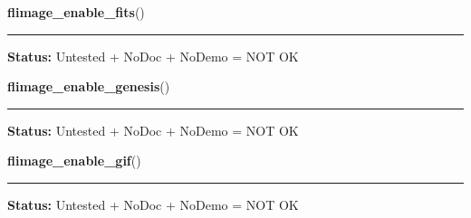     \label{xformslib:library:flimage_enable_fits}

    \vspace{0.5ex}

\hspace{.8\funcindent}\begin{boxedminipage}{\funcwidth}

    \raggedright \textbf{flimage\_enable\_fits}()

    \vspace{-1.5ex}

    \rule{\textwidth}{0.5\fboxrule}
\setlength{\parskip}{2ex}
\setlength{\parskip}{1ex}
\textbf{Status:} Untested + NoDoc + NoDemo = NOT OK



    \end{boxedminipage}

    \label{xformslib:library:flimage_enable_genesis}

    \vspace{0.5ex}

\hspace{.8\funcindent}\begin{boxedminipage}{\funcwidth}

    \raggedright \textbf{flimage\_enable\_genesis}()

    \vspace{-1.5ex}

    \rule{\textwidth}{0.5\fboxrule}
\setlength{\parskip}{2ex}
\setlength{\parskip}{1ex}
\textbf{Status:} Untested + NoDoc + NoDemo = NOT OK



    \end{boxedminipage}

    \label{xformslib:library:flimage_enable_gif}

    \vspace{0.5ex}

\hspace{.8\funcindent}\begin{boxedminipage}{\funcwidth}

    \raggedright \textbf{flimage\_enable\_gif}()

    \vspace{-1.5ex}

    \rule{\textwidth}{0.5\fboxrule}
\setlength{\parskip}{2ex}
\setlength{\parskip}{1ex}
\textbf{Status:} Untested + NoDoc + NoDemo = NOT OK



    \end{boxedminipage}

